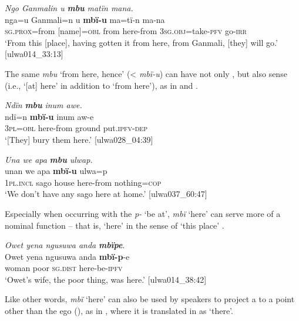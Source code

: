\ea%
    \label{ex:otherwc:88}
          \textit{Ngo Ganmalin u} \textbf{\textit{mbu}} \textit{matïn mana.}\\
\gll    nga=u        Ganmali=n  u    \textbf{mbï-u} ma=tï-n      ma-na\\
    \textsc{sg.prox=}from  [name]=\textsc{obl}  from  here-from    3\textsc{sg.obj}=take-\textsc{pfv}  go-\textsc{irr}\\
\glt `From this [place], having gotten it from here, from Ganmali, [they] will go.’ [ulwa014\_33:13]
\z

The same  \textit{mbu} ‘from here, hence’ (< \textit{mbï-u}) can have not only , but also  sense (i.e., ‘[at] here’ in addition to ‘from here’), as in  and .

\ea%
    \label{ex:otherwc:89}
         \textit{Ndïn} \textbf{\textit{mbu}} \textit{inum awe.}\\
\gll    ndï=n    \textbf{mbï-u}    inum  aw-e\\
    3\textsc{pl=obl}  here-from  ground  put.\textsc{ipfv-dep}\\
\glt `[They] bury them here.’ [ulwa028\_04:39]
\z

\ea%
    \label{ex:otherwc:90}
          \textit{Una we apa} \textbf{\textit{mbu}} \textit{ulwap.}\\
\gll    unan    we    apa    \textbf{mbï-u}    ulwa=p\\
    1\textsc{pl.incl}  sago  house  here-from  nothing=\textsc{cop}\\
\glt `We don’t have any sago here at home.’ [ulwa037\_60:47]
\z

Especially when occurring with the  \textit{p-} ‘be at’, \textit{mbï} ‘here’ can serve more of a nominal function -- that is, ‘here’ in the sense of ‘this place’ .

\ea%
    \label{ex:otherwc:91}
          \textit{Owet yena ngusuwa anda} \textbf{\textit{mbïpe}}.\\
\gll Owet  yena    ngusuwa  anda    \textbf{mbï-p}{}-e\\
    [name]  woman    poor    \textsc{sg.dist}  here-be\textsc{{}-ipfv}\\
\glt `Owet’s wife, the poor thing, was here.’ [ulwa014\_38:42]
\z

Like other  words, \textit{mbï} ‘here’ can also be used by speakers to project a  to a point other than the ego (), as in , where it is translated in  as ‘there’.

